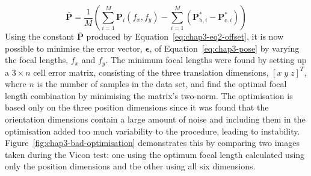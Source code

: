 \begin{equation}
  \label{eq:chap3-eq2-offset}
  \bar{\bm{P}} = \frac{1}{M} \left (\sum\limits_{i=1}^M \bm{P}_i(f_x, f_y) - \sum\limits_{i=1}^M(\bm{P}^*_{\mathrm{b},i} - \bm{P}^*_{\mathrm{c}, i})\right)
\end{equation}
Using the constant $\bar{\bm{P}}$ produced by Equation~\ref{eq:chap3-eq2-offset}, it is now possible to minimise the error vector, $\bm{\epsilon}$, of Equation~\ref{eq:chap3-pose} by varying the focal lengths, $f_x$ and $f_y$. The minimum focal lengths were found by setting up a $3\times n$ cell error matrix, consisting of the three translation dimensions, ${[x\;y\;z]}^T$, where $n$ is the number of samples in the data set, and find the optimal focal length combination by minimising the matrix's two-norm. The optimisation is based only on the three position dimensions since it was found that the orientation dimensions contain a large amount of noise and including them in the optimisation added too much variability to the procedure, leading to instability. Figure~\ref{fig:chap3-bad-optimisation} demonstrates this by comparing two images taken during the Vicon test: one using the optimum focal length calculated using only the position dimensions and the other using all six dimensions. 

